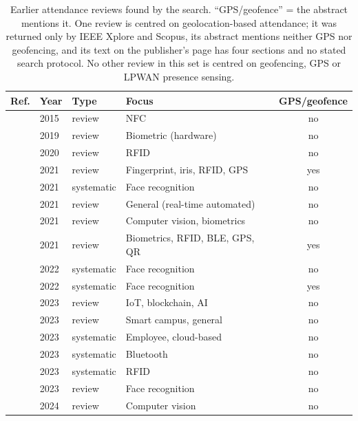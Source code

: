 \begin{table}[tbp]\centering\footnotesize
\caption{Earlier attendance reviews found by the search. ``GPS/geofence'' = the abstract mentions it. One review \cite{gupta2025geolocation} is centred on geolocation-based attendance; it was returned only by IEEE Xplore and Scopus, its abstract mentions neither GPS nor geofencing, and its text on the publisher's page has four sections and no stated search protocol. No other review in this set is centred on geofencing, GPS or LPWAN presence sensing.}\label{tab:prior}
\begin{tabular}{@{}L{3.3cm}llL{4.0cm}c@{}}\toprule Ref. & Year & Type & Focus & GPS/geofence \\ \midrule
\cite{binmohdnasir2015review} & 2015 & review & NFC & no \\
\cite{hoo2019biometric} & 2019 & review & Biometric (hardware) & no \\
\cite{x2020rfid} & 2020 & review & RFID & no \\
\cite{alagasan2021review} & 2021 & review & Fingerprint, iris, RFID, GPS & yes \\
\cite{anshari2021face} & 2021 & systematic & Face recognition & no \\
\cite{bai2021survey} & 2021 & review & General (real-time automated) & no \\
\cite{raj2021attendance} & 2021 & review & Computer vision, biometrics & no \\
\cite{x2021automation} & 2021 & review & Biometrics, RFID, BLE, GPS, QR & yes \\
\cite{budiman2023student} & 2022 & systematic & Face recognition & no \\
\cite{modak2022systematic} & 2022 & systematic & Face recognition & yes \\
\cite{abidemi2023attendance} & 2023 & review & IoT, blockchain, AI & no \\
\cite{anon2023smart} & 2023 & review & Smart campus, general & no \\
\cite{ardebili2022comprehensive} & 2023 & systematic & Employee, cloud-based & no \\
\cite{barbosadasilva2023student} & 2023 & systematic & Bluetooth & no \\
\cite{ishaq2023based} & 2023 & systematic & RFID & no \\
\cite{saxena2023review} & 2023 & review & Face recognition & no \\
\cite{alshamsi2024computer} & 2024 & review & Computer vision & no \\

\end{tabular}
\end{table}
